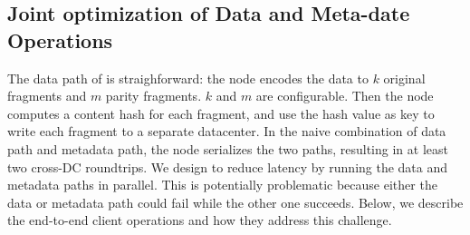 



\subsection{Joint optimization of Data and Meta-date Operations}

The data path of \name is straighforward: the \name node encodes the data to $k$ original
fragments and $m$ parity fragments. $k$ and $m$ are configurable. Then the node
computes a content hash for each fragment, and use the hash value as key to
write each fragment to a separate datacenter.  In the naive combination of data
path and metadata path, the \name node serializes the two paths,
resulting in at least two cross-DC roundtrips.  We design \name to reduce
latency by running the data and metadata paths in parallel.  This is
potentially problematic because either the data or metadata path could fail
while the other one succeeds.  Below, we describe the end-to-end client
operations and how they address this challenge.

